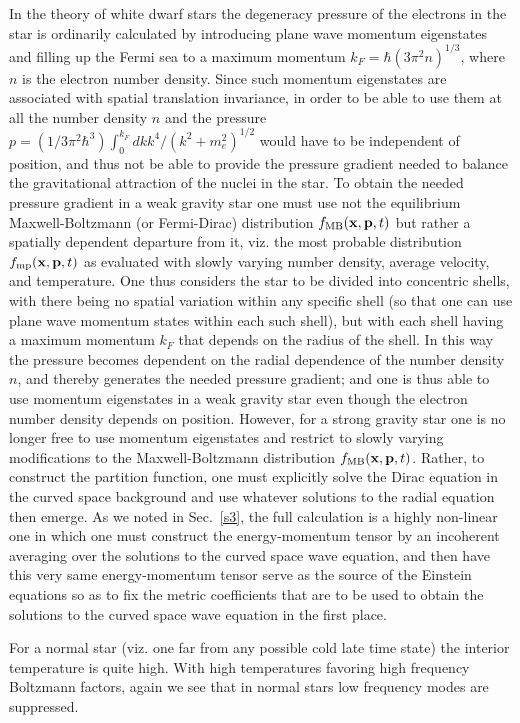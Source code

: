 \begin{thebibliography}{10}
 In the theory of white dwarf stars the degeneracy pressure of the electrons in the star is ordinarily calculated by introducing plane wave momentum eigenstates and filling up the Fermi sea to a maximum momentum $k_F=\hbar(3\pi^2 n)^{1/3}$, where $n$ is the electron number density.  Since such momentum eigenstates are associated with spatial translation invariance, in order to be able to use them at all the number density $n$ and the pressure $p=(1/3\pi^2\hbar^3)\int_0^{k_F}dk k^4/(k^2+m_e^2)^{1/2}$ would have to be independent of position,  and thus not be able to provide the pressure gradient needed to balance the gravitational attraction of the nuclei in the star. To obtain the needed pressure gradient in a weak gravity star one must use not the equilibrium Maxwell-Boltzmann (or Fermi-Dirac) distribution $f_{\rm MB}({\bf x}, {\bf p},t)$ but rather a spatially dependent departure from it, viz. the most probable distribution $f_{\rm mp}({\bf x}, {\bf p},t)$ as evaluated with slowly varying number density, average velocity, and temperature. One thus considers the star to be divided into concentric shells, with there being no spatial variation within any specific shell (so that one can use plane wave momentum states within each such shell), but with each shell having a maximum momentum $k_F$ that depends on the radius of the shell. In this way the pressure becomes dependent on the radial dependence of the number density $n$, and thereby generates the needed pressure gradient; and one is thus able to use momentum eigenstates in a weak gravity star even though the electron number density depends on position. However, for a strong gravity star one is no longer free to use momentum eigenstates and restrict to slowly varying modifications to the Maxwell-Boltzmann distribution $f_{\rm MB}({\bf x}, {\bf p},t)$. Rather, to construct the partition function, one must explicitly solve the Dirac equation in the curved space background and use whatever solutions to the radial equation then emerge. As we noted in Sec.~\ref{s3}, the full calculation is a highly non-linear one in which one must construct the energy-momentum tensor by an incoherent averaging over the solutions to the curved space wave equation, and then have this very same energy-momentum tensor  serve as the source of the Einstein equations so as to fix the metric coefficients that are to be used to obtain the solutions to the curved space wave equation in the first place. 

 For a normal star (viz. one far from any possible cold late time state) the interior temperature is quite high. With high temperatures favoring high frequency Boltzmann factors, again we see that in normal stars low frequency modes are suppressed.



\end{thebibliography}
